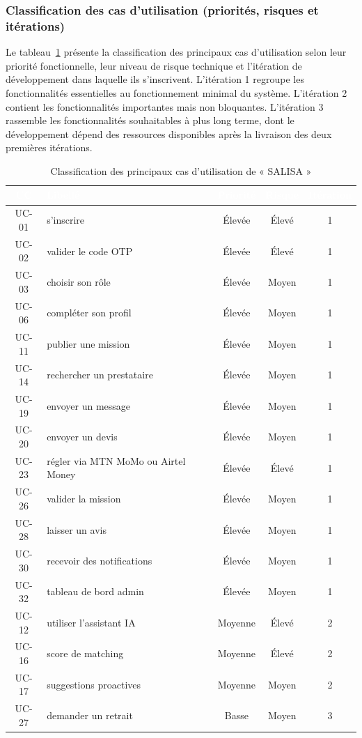 \subsubsection{Classification des cas d'utilisation (priorités, risques et itérations)}

Le tableau~\ref{tab:classification_cu} présente la classification des principaux cas d'utilisation selon leur priorité fonctionnelle, leur niveau de risque technique et l'itération de développement dans laquelle ils s'inscrivent. L'itération 1 regroupe les fonctionnalités essentielles au fonctionnement minimal du système. L'itération 2 contient les fonctionnalités importantes mais non bloquantes. L'itération 3 rassemble les fonctionnalités souhaitables à plus long terme, dont le développement dépend des ressources disponibles après la livraison des deux premières itérations.

\begin{table}[H]
	\caption{Classification des principaux cas d'utilisation de « SALISA »}
	\label{tab:classification_cu}
	\centering
	\begin{tabular}{|c|p{4.5cm}|c|c|c|}
		\hline
		\rowcolor{vertCongo}
		\textcolor{white}{\textbf{UC}} &
		\textcolor{white}{\textbf{Libellé}} &
		\textcolor{white}{\textbf{Priorité}} &
		\textcolor{white}{\textbf{Risque}} &
		\textcolor{white}{\textbf{Itération}} \\
		\hline
		UC-01 & s'inscrire & Élevée & Élevé & 1 \\
		\hline
		UC-02 & valider le code OTP & Élevée & Élevé & 1 \\
		\hline
		UC-03 & choisir son rôle & Élevée & Moyen & 1 \\
		\hline
		UC-06 & compléter son profil & Élevée & Moyen & 1 \\
		\hline
		UC-11 & publier une mission & Élevée & Moyen & 1 \\
		\hline
		UC-14 & rechercher un prestataire & Élevée & Moyen & 1 \\
		\hline
		UC-19 & envoyer un message & Élevée & Moyen & 1 \\
		\hline
		UC-20 & envoyer un devis & Élevée & Moyen & 1 \\
		\hline
		UC-23 & régler via MTN MoMo ou Airtel Money & Élevée & Élevé & 1 \\
		\hline
		UC-26 & valider la mission & Élevée & Moyen & 1 \\
		\hline
		UC-28 & laisser un avis & Élevée & Moyen & 1 \\
		\hline
		UC-30 & recevoir des notifications & Élevée & Moyen & 1 \\
		\hline
		UC-32 & tableau de bord admin & Élevée & Moyen & 1 \\
		\hline
		UC-12 & utiliser l'assistant IA & Moyenne & Élevé & 2 \\
		\hline
		UC-16 & score de matching & Moyenne & Élevé & 2 \\
		\hline
		UC-17 & suggestions proactives & Moyenne & Moyen & 2 \\
		\hline
		UC-27 & demander un retrait & Basse & Moyen & 3 \\
		\hline
	\end{tabular}
\end{table}

